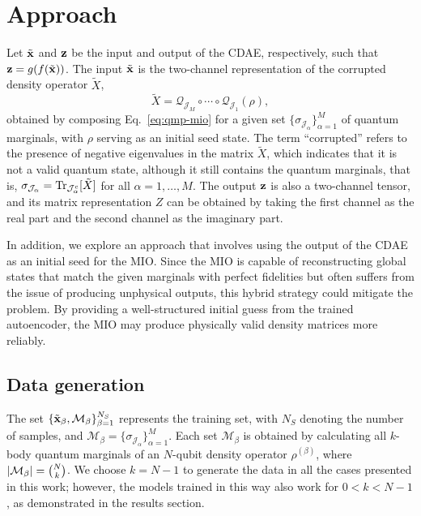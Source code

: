 \section{Approach}
\label{sec:qmp-approach}

Let $\tilde{\vb{x}}$ and $\vb{z}$ be the input and output of the CDAE, respectively, such that $\vb{z} = g(f(\tilde{\vb{x}}))$. The input $\tilde{\vb{x}}$ is the two-channel representation of the corrupted density operator $\tilde{X}$,
\begin{equation}
\label{eq:qmp-corrupted}
\tilde{X} = \mathcal{Q}_{\mathcal{J}_M} \circ \cdots \circ \mathcal{Q}_{\mathcal{J}_1}(\rho),
\end{equation}
obtained by composing Eq.~\eqref{eq:qmp-mio} for a given set $\{\sigma_{\mathcal{J}_\alpha}\}_{\alpha=1}^{M}$ of quantum marginals, with $\rho$ serving as an initial seed state. The term ``corrupted'' refers to the presence of negative eigenvalues in the matrix $\tilde{X}$, which indicates that it is not a valid quantum state, although it still contains the quantum marginals, that is, $\sigma_{\mathcal{J}_\alpha} = \Tr_{\mathcal{J}_\alpha^c}[\tilde{X}]$ for all $\alpha = 1, \ldots, M$. The output $\vb{z}$ is also a two-channel tensor, and its matrix representation $Z$ can be obtained by taking the first channel as the real part and the second channel as the imaginary part.

In addition, we explore an approach that involves using the output of the CDAE as an initial seed for the MIO. Since the MIO is capable of reconstructing global states that match the given marginals with perfect fidelities but often suffers from the issue of producing unphysical outputs, this hybrid strategy could mitigate the problem. By providing a well-structured initial guess from the trained autoencoder, the MIO may produce physically valid density matrices more reliably.

\subsection{Data generation}
\label{sec:qmp-data}

The set $\{\tilde{\vb{x}}_\beta, \mathcal{M}_\beta\}_{\beta=1}^{N_S}$ represents the training set, with $N_S$ denoting the number of samples, and $\mathcal{M}_\beta = \{\sigma_{\mathcal{J}_\alpha}\}_{\alpha=1}^{M}$. Each set $\mathcal{M}_\beta$ is obtained by calculating all $k$-body quantum marginals of an $N$-qubit density operator $\rho^{(\beta)}$, where $\abs{\mathcal{M}_\beta} = \binom{N}{k}$. We choose $k = N-1$ to generate the data in all the cases presented in this work; however, the models trained in this way also work for $0 < k < N-1$, as demonstrated in the results section.

